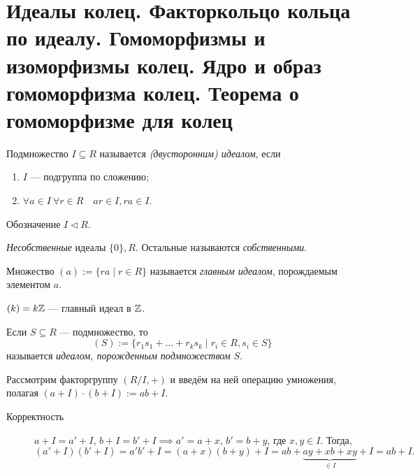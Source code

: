 \section{Идеалы колец. Факторкольцо кольца по идеалу. Гомоморфизмы и изоморфизмы колец. Ядро и образ гомоморфизма колец. Теорема о гомоморфизме для колец}

\begin{definition}
    Подмножество $I \subseteq R$ называется \textit{(двусторонним) идеалом}, если
    \begin{enumerate}
    \item $I$ --- подгруппа по сложению;
    \item $\forall a \in I \ \forall r \in R \quad ar \in I, ra \in I$.
    \end{enumerate}

    Обозначение $I \lhd R$.
\end{definition}

\begin{example}
    \textit{Несобственные} идеалы $ \{0\}, R$. Остальные называются \textit{собственными}.
\end{example}

\begin{definition}
    Множество $(a) := \{ra \mid r \in R\}$ называется \textit{главным идеалом}, порождаемым элементом $a$. 
\end{definition}

\begin{example}
    $(k) = k\mathbb{Z}$ --- главный идеал в $\mathbb{Z}$.
\end{example}

\begin{comment}
    $(a) = R \iff a$ обратим

    $(a) = \{0\} \iff a = 0$.
\end{comment}


\begin{definition}
    Если $S \subseteq R$ --- подмножество, то 
    \begin{equation*}
        (S) := \{r_1 s_1 + \dots + r_k s_k \mid r_i \in R, s_i \in S\}
    \end{equation*}
    называется \textit{идеалом, порожденным подмножеством} $S$.
\end{definition}

\bigskip
Рассмотрим факторгруппу $(R/I, +)$ и введём на ней операцию умножения, полагая $(a + I) \cdot (b + I) := ab + I$.

\begin{description}
\item[Корректность] $a + I = a' + I$, $b + I = b' + I \implies a' = a + x$, $b' = b + y$, где $x, y \in I$. Тогда, 
    \begin{equation*}
        (a' + I)(b' + I) = a' b' + I = (a + x) (b + y) + I = ab + \underbrace{ay + xb + xy}_{\in I} + I = ab + I
    .\end{equation*}
\end{description}

